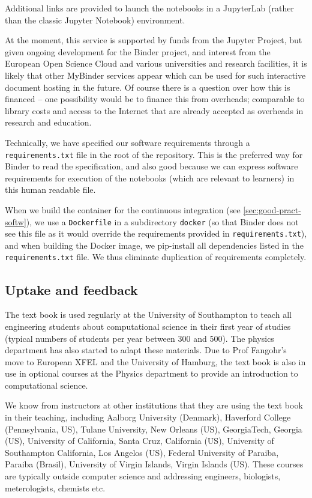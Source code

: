 \documentclass{deliverablereport}
\begin{document}
Additional links are provided to launch the notebooks in a JupyterLab
(rather than the classic Jupyter Notebook) environment.

At the moment, this service is supported by funds from the Jupyter
Project, but given ongoing development for the Binder project, and
interest from the European Open Science Cloud and various universities
and research facilities, it is likely that other MyBinder services
appear which can be used for such interactive document hosting in the
future. Of course there is a question over how this is financed -- one
possibility would be to finance this from overheads; comparable to
library costs and access to the Internet that are already accepted as
overheads in research and education.

Technically, we have specified our software requirements through a
\texttt{requirements.txt} file in the root of the repository. This is
the preferred way for Binder to read the specification, and also good
because we can express software requirements for execution of the
notebooks (which are relevant to learners) in this human readable
file.

When we build the container for the continuous integration (see
\ref{sec:good-pract-softw}), we use a \texttt{Dockerfile} in a subdirectory
\texttt{docker} (so that Binder does not see this file as it would
override the requirements provided in \texttt{requirements.txt}), and
when building the Docker image, we pip-install all dependencies listed
in the \texttt{requirements.txt} file. We thus eliminate duplication
of requirements completely.

\subsection{Uptake and feedback}

The text book is used regularly at the University of Southampton to
teach all engineering students about computational science in their
first year of studies (typical numbers of students per year between
300 and 500). The physics department has also started to adapt these
materials. Due to Prof Fangohr's move to European XFEL and the
University of Hamburg, the text book is also in use in optional
courses at the Physics department to provide an introduction to
computational science.

We know from instructors at other institutions that they are using the
text book in their teaching, including Aalborg University (Denmark),
Haverford College (Pennsylvania, US), Tulane University, New Orleans
(US), GeorgiaTech, Georgia (US), University of California, Santa Cruz,
California (US), University of Southampton California, Los Angelos
(US), Federal University of Paraiba, Paraiba (Brasil), University of
Virgin Islands, Virgin Islands (US). These courses are typically
outside computer science and addressing engineers, biologists,
meterologists, chemists etc.
\end{document}
